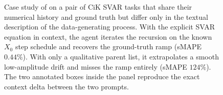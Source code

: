 \begin{figure}[h]
{\begin{tcolorbox}[colback=gray!5!white, colframe=pink!120,
title=Case Study C.1: \method{} on Context-is-Key: How Textual Context Steers the Forecast,
boxrule=0.3mm, width=1.2\textwidth, arc=2mm, auto outer arc=true]
\end{tcolorbox}}
\caption{
Case study of \method{} on a pair of CiK SVAR tasks that share their
numerical history and ground truth but differ only in the textual
description of the data-generating process. With the explicit SVAR
equation in context, the agent iterates the recursion on the known $X_0$
step schedule and recovers the ground-truth ramp (sMAPE $0.44\%$). With
only a qualitative parent list, it extrapolates a smooth low-amplitude
drift and misses the ramp entirely (sMAPE $124\%$). The two annotated
boxes inside the panel reproduce the exact context delta between the two
prompts.
}
\label{fig:cik_case_study_svar}
\end{figure}






\clearpage




